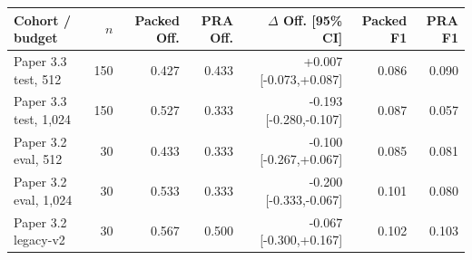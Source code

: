 \begin{tabular}{lrrrrrr}
\toprule
Cohort / budget & $n$ & Packed Off. & PRA Off. & $\Delta$ Off. [95\% CI] & Packed F1 & PRA F1 \\
\midrule
Paper 3.3 test, 512 & 150 & 0.427 & 0.433 & +0.007 [-0.073,+0.087] & 0.086 & 0.090 \\
Paper 3.3 test, 1,024 & 150 & 0.527 & 0.333 & -0.193 [-0.280,-0.107] & 0.087 & 0.057 \\
Paper 3.2 eval, 512 & 30 & 0.433 & 0.333 & -0.100 [-0.267,+0.067] & 0.085 & 0.081 \\
Paper 3.2 eval, 1,024 & 30 & 0.533 & 0.333 & -0.200 [-0.333,-0.067] & 0.101 & 0.080 \\
Paper 3.2 legacy-v2 & 30 & 0.567 & 0.500 & -0.067 [-0.300,+0.167] & 0.102 & 0.103 \\
\bottomrule
\end{tabular}
